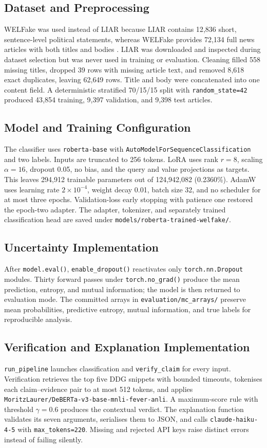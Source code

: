 \documentclass[10pt,twocolumn,letterpaper]{article}
\begin{document}
\subsection{Dataset and Preprocessing}
WELFake was used instead of LIAR because LIAR contains 12{,}836 short,
sentence-level political statements, whereas WELFake provides 72{,}134 full news
articles with both titles and bodies \cite{wang2017liar,verma2021welfake}. LIAR
was downloaded and inspected during dataset selection but was never used in
training or evaluation. Cleaning filled 558 missing titles, dropped 39 rows with
missing article text, and removed 8{,}618 exact duplicates, leaving 62{,}649 rows.
Title and body were concatenated into one content field. A deterministic stratified
70/15/15 split with \texttt{random\_state=42} produced 43{,}854 training, 9{,}397
validation, and 9{,}398 test articles.

\subsection{Model and Training Configuration}
The classifier uses \texttt{roberta-base} with
\texttt{AutoModelForSequenceClassification} and two labels. Inputs are truncated
to 256 tokens. LoRA uses rank $r=8$, scaling $\alpha=16$, dropout 0.05, no bias,
and the query and value projections as targets. This leaves 294{,}912 trainable
parameters out of 124{,}942{,}082 (0.2360\%). AdamW uses learning rate
$2\times10^{-4}$, weight decay 0.01, batch size 32, and no scheduler for at most
three epochs. Validation-loss early stopping with patience one restored the
epoch-two adapter. The adapter, tokenizer, and separately trained classification
head are saved under \texttt{models/roberta-trained-welfake/}.

\subsection{Uncertainty Implementation}
After \texttt{model.eval()}, \texttt{enable\_dropout()} reactivates only
\texttt{torch.nn.Dropout} modules. Thirty forward passes under
\texttt{torch.no\_grad()} produce the mean prediction, entropy, and mutual
information; the model is then returned to evaluation mode. The committed arrays
in \texttt{evaluation/mc\_arrays/} preserve mean probabilities, predictive
entropy, mutual information, and true labels for reproducible analysis.

\subsection{Verification and Explanation Implementation}
\texttt{run\_pipeline} launches classification and \texttt{verify\_claim} for
every input. Verification retrieves the top five DDG snippets with bounded
timeouts, tokenises each claim--evidence pair to at most 512 tokens, and applies
\texttt{MoritzLaurer/DeBERTa-v3-base-mnli-fever-anli}. A maximum-score rule with
threshold $\gamma=0.6$ produces the contextual verdict. The explanation function
validates its seven arguments, serialises them to JSON, and calls
\texttt{claude-haiku-4-5} with \texttt{max\_tokens=220}. Missing and rejected API
keys raise distinct errors instead of failing silently.
\end{document}
